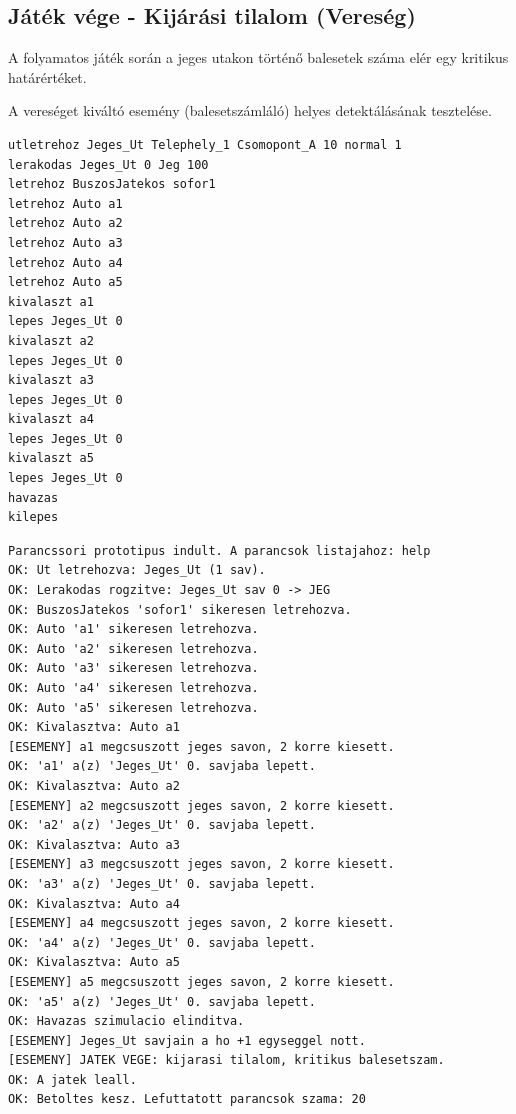 \subsection{Játék vége - Kijárási tilalom (Vereség)}
\begin{test-case-description}
    A folyamatos játék során a jeges utakon történő balesetek száma elér egy kritikus határértéket.
\end{test-case-description}
\begin{test-case-function}
    A vereséget kiváltó esemény (balesetszámláló) helyes detektálásának tesztelése.
\end{test-case-function}
\begin{test-case-input}
\begin{verbatim}
utletrehoz Jeges_Ut Telephely_1 Csomopont_A 10 normal 1
lerakodas Jeges_Ut 0 Jeg 100
letrehoz BuszosJatekos sofor1
letrehoz Auto a1
letrehoz Auto a2
letrehoz Auto a3
letrehoz Auto a4
letrehoz Auto a5
kivalaszt a1
lepes Jeges_Ut 0
kivalaszt a2
lepes Jeges_Ut 0
kivalaszt a3
lepes Jeges_Ut 0
kivalaszt a4
lepes Jeges_Ut 0
kivalaszt a5
lepes Jeges_Ut 0
havazas
kilepes
\end{verbatim}
\end{test-case-input}
\begin{test-case-output}
\begin{verbatim}
Parancssori prototipus indult. A parancsok listajahoz: help
OK: Ut letrehozva: Jeges_Ut (1 sav).
OK: Lerakodas rogzitve: Jeges_Ut sav 0 -> JEG
OK: BuszosJatekos 'sofor1' sikeresen letrehozva.
OK: Auto 'a1' sikeresen letrehozva.
OK: Auto 'a2' sikeresen letrehozva.
OK: Auto 'a3' sikeresen letrehozva.
OK: Auto 'a4' sikeresen letrehozva.
OK: Auto 'a5' sikeresen letrehozva.
OK: Kivalasztva: Auto a1
[ESEMENY] a1 megcsuszott jeges savon, 2 korre kiesett.
OK: 'a1' a(z) 'Jeges_Ut' 0. savjaba lepett.
OK: Kivalasztva: Auto a2
[ESEMENY] a2 megcsuszott jeges savon, 2 korre kiesett.
OK: 'a2' a(z) 'Jeges_Ut' 0. savjaba lepett.
OK: Kivalasztva: Auto a3
[ESEMENY] a3 megcsuszott jeges savon, 2 korre kiesett.
OK: 'a3' a(z) 'Jeges_Ut' 0. savjaba lepett.
OK: Kivalasztva: Auto a4
[ESEMENY] a4 megcsuszott jeges savon, 2 korre kiesett.
OK: 'a4' a(z) 'Jeges_Ut' 0. savjaba lepett.
OK: Kivalasztva: Auto a5
[ESEMENY] a5 megcsuszott jeges savon, 2 korre kiesett.
OK: 'a5' a(z) 'Jeges_Ut' 0. savjaba lepett.
OK: Havazas szimulacio elinditva.
[ESEMENY] Jeges_Ut savjain a ho +1 egyseggel nott.
[ESEMENY] JATEK VEGE: kijarasi tilalom, kritikus balesetszam.
OK: A jatek leall.
OK: Betoltes kesz. Lefuttatott parancsok szama: 20
\end{verbatim}
\end{test-case-output}

